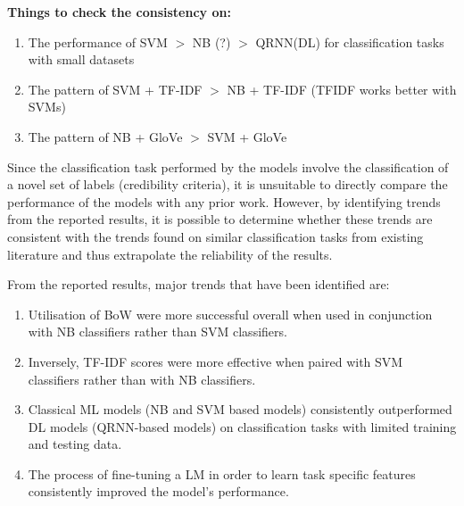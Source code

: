 \documentclass[a4paper,twoside,phd]{BYUPhys}
\begin{document}
\textbf{Things to check the consistency on:}
\begin{enumerate}[-]
	\item The performance of SVM $>$ NB (?) $>$ QRNN(DL) for classification tasks with small datasets
	\item The pattern of SVM + TF-IDF $>$ NB + TF-IDF (TFIDF works better with SVMs)
	\item The pattern of NB + GloVe $>$ SVM + GloVe
\end{enumerate}
\fi

Since the classification task performed by the models involve the classification of a novel set of labels (credibility criteria), it is unsuitable to directly compare the performance of the models with any prior work. However, by identifying trends from the reported results, it is possible to determine whether these trends are consistent with the trends found on similar classification tasks from existing literature and thus extrapolate the reliability of the results. \newline

From the reported results, major trends that have been identified are:

\begin{enumerate}
	\item Utilisation of BoW were more successful overall when used in conjunction with NB classifiers rather than SVM classifiers.
	\item Inversely, TF-IDF scores were more effective when paired with SVM classifiers rather than with NB classifiers.
	\item Classical ML models (NB and SVM based models) consistently outperformed DL models (QRNN-based models) on classification tasks with limited training and testing data.
	\item The process of fine-tuning a LM in order to learn task specific features consistently improved the model's performance.
\end{enumerate}
\end{document}
